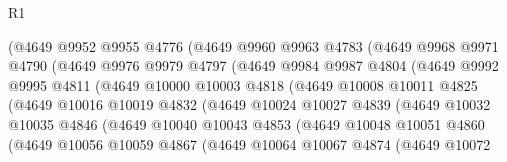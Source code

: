 \begin{lexlean}{R1}
\begin{coremodule}
                    (@4649
                      @9952
                      @9955
                      @4776
                      (@4649
                        @9960
                        @9963
                        @4783
                        (@4649
                          @9968
                          @9971
                          @4790
                          (@4649
                            @9976
                            @9979
                            @4797
                            (@4649
                              @9984
                              @9987
                              @4804
                              (@4649
                                @9992
                                @9995
                                @4811
                                (@4649
                                  @10000
                                  @10003
                                  @4818
                                  (@4649
                                    @10008
                                    @10011
                                    @4825
                                    (@4649
                                      @10016
                                      @10019
                                      @4832
                                      (@4649
                                        @10024
                                        @10027
                                        @4839
                                        (@4649
                                          @10032
                                          @10035
                                          @4846
                                          (@4649
                                            @10040
                                            @10043
                                            @4853
                                            (@4649
                                              @10048
                                              @10051
                                              @4860
                                              (@4649
                                                @10056
                                                @10059
                                                @4867
                                                (@4649
                                                  @10064
                                                  @10067
                                                  @4874
                                                  (@4649
                                                    @10072

\end{coremodule}
\end{lexlean}
